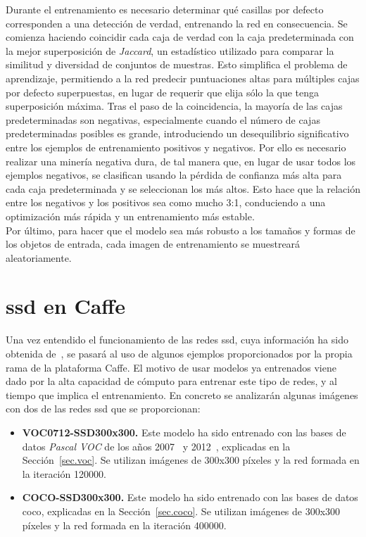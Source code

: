 Durante el entrenamiento es necesario determinar qué casillas por defecto corresponden a una detección de verdad, entrenando la red en consecuencia. Se comienza haciendo coincidir cada caja de verdad con la caja predeterminada con la mejor superposición de \textit{Jaccard}, un estadístico utilizado para comparar la similitud y diversidad de conjuntos de muestras. 
Esto simplifica el problema de aprendizaje, permitiendo a la red predecir puntuaciones altas para múltiples cajas por defecto superpuestas, en lugar de requerir que elija sólo la que tenga superposición máxima. Tras el paso de la coincidencia, la mayoría de las cajas predeterminadas son negativas, especialmente cuando el número de cajas predeterminadas posibles es grande, introduciendo un desequilibrio significativo entre los ejemplos de entrenamiento positivos y negativos. Por ello es necesario realizar una minería negativa dura, de tal manera que, en lugar de usar todos los ejemplos negativos, se clasifican usando la pérdida de confianza más alta para cada caja predeterminada y se seleccionan los más altos. Esto hace que la relación entre los negativos y los positivos sea como mucho 3:1, conduciendo a una optimización más rápida y un entrenamiento más estable. \\

Por último, para hacer que el modelo sea más robusto a los tamaños y formas de los objetos de entrada, cada imagen de entrenamiento se muestreará aleatoriamente.

\section{\acrshort{ssd} en Caffe}
Una vez entendido el funcionamiento de las redes \acrshort{ssd}, cuya información ha sido obtenida de~\cite{2015arXiv151202325L}, se pasará al uso de algunos ejemplos proporcionados por la propia rama de la plataforma Caffe. El motivo de usar modelos ya entrenados viene dado por la alta capacidad de cómputo para entrenar este tipo de redes, y al tiempo que implica el entrenamiento. En concreto se analizarán algunas imágenes con dos de las redes \acrshort{ssd} que se proporcionan:
\begin{itemize}
	\item \textbf{VOC0712-SSD300x300.} Este modelo ha sido entrenado con las bases de datos \textit{Pascal VOC} de los años 2007~\cite{pascal-voc-2007} y 2012~\cite{pascal-voc-2012}, explicadas en la Sección~\ref{sec.voc}. Se utilizan imágenes de 300x300 píxeles y la red formada en la iteración 120000.
	\item \textbf{COCO-SSD300x300.} Este modelo ha sido entrenado con las bases de datos \acrshort{coco}, explicadas en la Sección~\ref{sec.coco}. Se utilizan imágenes de 300x300 píxeles y la red formada en la iteración 400000.
\end{itemize}


